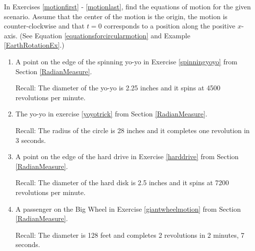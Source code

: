 \documentclass{ximera}
\begin{document}
In Exercises \ref{motionfirst} - \ref{motionlast}, find the equations of motion for the given scenario.  Assume that the center of the motion is the origin, the motion is counter-clockwise and that $t = 0$ corresponds to a position along the positive $x$-axis.  (See Equation \ref{equationsforcircularmotion} and Example \ref{EarthRotationEx}.)

\begin{enumerate}

\setcounter{enumi}{\value{HW}}

\item  \label{motionfirst} A point on the edge of the spinning yo-yo in Exercise \ref{spinningyoyo} from Section \ref{RadianMeasure}. 

Recall: The diameter of the yo-yo is 2.25 inches and it spins at 4500 revolutions per minute.

\item  The yo-yo in exercise \ref{yoyotrick} from Section \ref{RadianMeasure}.

Recall: The radius of the circle is 28 inches and it completes one revolution in 3 seconds.

\item A point on the edge of the hard drive in Exercise \ref{harddrive} from Section \ref{RadianMeasure}.

Recall:  The diameter of the hard disk is 2.5 inches and it spins at 7200 revolutions per minute.

\item  \label{motionlast} A passenger on the Big Wheel in Exercise \ref{giantwheelmotion} from Section \ref{RadianMeasure}.

Recall: The diameter is 128 feet and completes 2 revolutions in 2 minutes, 7 seconds.

\setcounter{HW}{\value{enumi}}

\end{enumerate}
\end{document}
